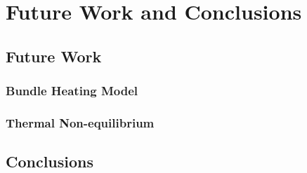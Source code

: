\chapter{Future Work and Conclusions}\label{ch:conclusions}

\section{Future Work}\label{sec:future-work}

\subsection{Bundle Heating Model}\label{sec:bundle}

\subsection{Thermal Non-equilibrium}\label{sec:tne}

\section{Conclusions}\label{sec:conclusions}